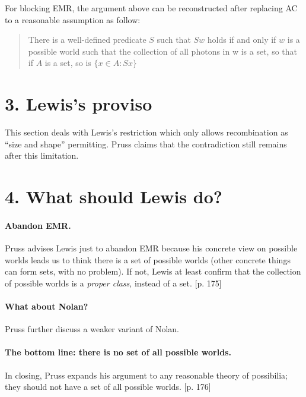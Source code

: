 \documentclass[
10pt, %
a4paper, %
twocolumn, %
landscape %
]{article}
\begin{document}
For blocking EMR, the argument above can be reconstructed after replacing AC to a reasonable assumption as follow:

\begin{quote}
  There is a well-defined predicate $S$ such that $Sw$ holds if and only if $w$ is a possible world such that the collection of all photons in w is a set, so that if $A$ is a set, so is $\{ x \in A : Sx \}$
\end{quote}

\section*{3. Lewis's proviso}
This section deals with Lewis's restriction which only allows recombination as ``size and shape'' permitting. Pruss claims that the contradiction still remains after this limitation. 

\section*{4. What should Lewis do?}
\paragraph{Abandon EMR.}
Pruss advises Lewis just to abandon EMR because his concrete view on possible worlds leads us to think there is a set of possible worlds (other concrete things can form sets, with no problem). If not, Lewis at least confirm that the collection of possible worlds is a \emph{proper class}, instead of a set. [p. 175]

\paragraph{What about Nolan?}
Pruss further discuss a weaker variant of Nolan.

\paragraph{The bottom line: there is no set of all possible worlds.}
In closing, Pruss expands his argument to any reasonable theory of possibilia; they should not have a set of all possible worlds.
[p. 176]



\end{document}
